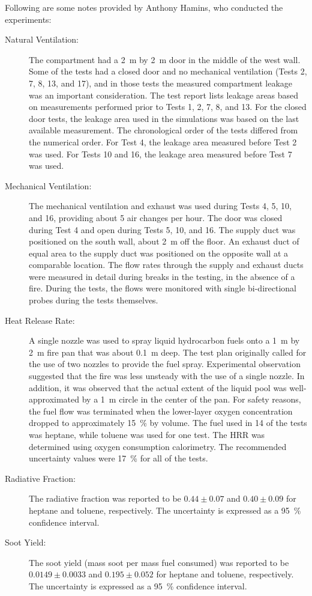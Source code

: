 Following are some notes provided by Anthony Hamins, who conducted the experiments:
\begin{description}
\item[Natural Ventilation:] The compartment had a 2~m by 2~m door in the middle of the west wall. Some of the tests had a closed door and no mechanical
ventilation (Tests 2, 7, 8, 13, and 17), and in those tests the measured compartment leakage was an important consideration. The test report lists leakage
areas based on measurements performed prior to Tests 1, 2, 7, 8, and 13. For the closed door tests, the leakage area used in the simulations was
based on the last available measurement. The chronological order of the tests differed from the numerical order.
For Test 4, the leakage area measured before Test 2 was used. For Tests 10 and 16, the leakage area
measured before Test 7 was used.
\item[Mechanical Ventilation:] The mechanical ventilation and exhaust was used during Tests 4, 5, 10, and 16, providing about 5 air changes per hour. The
door was closed during Test 4 and open during Tests 5, 10, and 16. The supply duct was positioned on the south wall, about 2~m off the floor. An
exhaust duct of equal area to the supply duct was positioned on the opposite wall at a comparable location. The flow rates through the supply and
exhaust ducts were measured in detail during breaks in the testing, in the absence of a fire. During the tests, the flows were monitored with single
bi-directional probes during the tests themselves.
\item[Heat Release Rate:] A single nozzle was used to spray liquid hydrocarbon fuels onto a 1~m by 2~m fire pan that was about 0.1~m deep. The test plan
originally called for the use of two nozzles to provide the fuel spray. Experimental observation suggested that the fire was less unsteady with the
use of a single nozzle. In addition, it was observed that the actual extent of the liquid pool was well-approximated by a 1~m circle in the
center of the pan. For safety reasons, the fuel flow was terminated when the lower-layer oxygen concentration
dropped to approximately 15~\% by volume.
The fuel used in 14 of the tests was heptane, while toluene was used for one test. The HRR was
determined using oxygen consumption calorimetry. The recommended uncertainty values
were 17~\% for all of the tests.
\item[Radiative Fraction:]  The radiative fraction was reported to be $0.44 \pm 0.07$ and $0.40 \pm 0.09$ for heptane and toluene, respectively. The uncertainty is expressed as a 95~\% confidence interval.
\item[Soot Yield:]  The soot yield (mass soot per mass fuel consumed) was reported to be $0.0149 \pm 0.0033$ and $0.195 \pm 0.052$ for heptane and toluene, respectively. The uncertainty is expressed as a 95~\% confidence interval.
\end{description}


